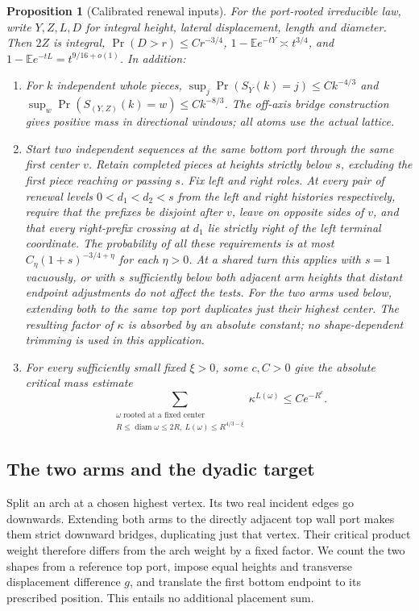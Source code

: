 \documentclass[11pt]{article}
\numberwithin{equation}{section}
\newtheorem{proposition}[theorem]{Proposition}
\theoremstyle{definition}\newtheorem{definition}[theorem]{Definition}
\theoremstyle{remark}\newtheorem{remark}[theorem]{Remark}
\DeclareMathOperator{\diam}{diam}\DeclareMathOperator{\dist}{dist}
\begin{document}
\begin{proposition}[Calibrated renewal inputs]\label{c:calibrated-inputs}
For the port-rooted irreducible law, write $Y,Z,L,D$ for integral height,
lateral displacement, length and diameter. Then $2Z$ is integral,
$\Pr(D>r)\le Cr^{-3/4}$,
$1-\mathbb E e^{-tY}\asymp t^{3/4}$, and
$1-\mathbb E e^{-tL}=t^{9/16+o(1)}$. In addition:
\begin{enumerate}
\item[(i)] For $k$ independent whole pieces,
$\sup_j\Pr(S_Y(k)=j)\le Ck^{-4/3}$ and
$\sup_w\Pr(S_{(Y,Z)}(k)=w)\le Ck^{-8/3}$.
The off-axis bridge construction gives positive mass in directional
windows; all atoms use the actual lattice.
\item[(ii)] Start two independent sequences at the same bottom port
through the same first center $v$. Retain completed pieces at heights
strictly below $s$, excluding the first piece reaching or passing $s$.
Fix left and right roles. At every pair of renewal levels
$0<d_1<d_2<s$ from the left and right histories respectively, require
that the prefixes be disjoint after $v$, leave on opposite sides of $v$,
and that every right-prefix crossing at $d_1$ lie strictly right of the
left terminal coordinate. The probability of all these requirements is
at most $C_\eta(1+s)^{-3/4+\eta}$ for each $\eta>0$.
At a shared turn this applies with $s=1$ vacuously, or with $s$
sufficiently below both adjacent arm heights that distant endpoint
adjustments do not affect the tests. For the two arms used below, extending both to the same top port
duplicates just their highest center. The resulting factor of $\kappa$
is absorbed by an absolute constant; no shape-dependent trimming is
used in this application.
\item[(iii)] For every sufficiently small fixed $\xi>0$, some $c,C>0$
give the absolute critical mass estimate
\[
 \sum_{\substack{\omega\text{ rooted at a fixed center}\\
 R\le\diam\omega\le2R,\ L(\omega)\le R^{4/3-\xi}}}
 \kappa^{L(\omega)}\le C e^{-R^c}.
\]
\end{enumerate}
\end{proposition}

\subsection{The two arms and the dyadic target}
Split an arch at a chosen highest vertex. Its two real incident edges go
downwards. Extending both arms to the directly adjacent top wall port
makes them strict downward bridges, duplicating just that vertex. Their
critical product weight therefore differs from the arch weight by a
fixed factor. We count the two shapes from a reference top port, impose
equal heights and transverse displacement difference $g$, and translate
the first bottom endpoint to its prescribed position. This entails no
additional placement sum.
\end{document}
